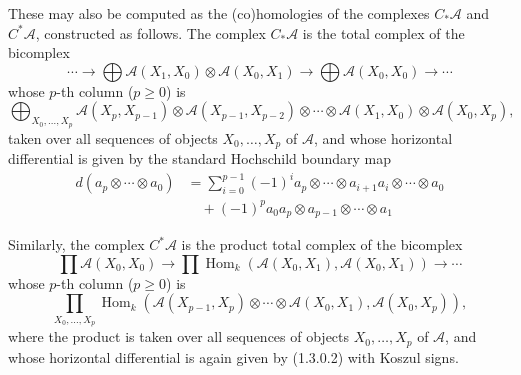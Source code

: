\documentclass[12pt]{article}
\begin{document}
These may also be computed as the (co)homologies of the complexes
\(C_{\ast}\mathcal{A}\) and \(C^{\ast}\mathcal{A}\),
constructed as follows.  
The complex \(C_{\ast}\mathcal{A}\) is the total complex of the bicomplex
\[
\cdots 
\longrightarrow 
\bigoplus \mathcal{A}(X_1,X_0) \otimes \mathcal{A}(X_0,X_1)
\longrightarrow 
\bigoplus \mathcal{A}(X_0,X_0)
\longrightarrow \cdots
\]
whose \(p\)-th column (\(p\ge0\)) is
\[
  \bigoplus_{X_0,\dots,X_p} 
  \mathcal{A}(X_p,X_{p-1}) \otimes \mathcal{A}(X_{p-1},X_{p-2})
  \otimes \cdots \otimes \mathcal{A}(X_1,X_0) \otimes \mathcal{A}(X_0,X_p),
\]
taken over all sequences of objects \(X_0,\dots,X_p\) of \(\mathcal{A}\),
and whose horizontal differential is given by the standard Hochschild boundary map
\begin{align*}
  d(a_p \otimes \cdots \otimes a_0)
  &= \sum_{i=0}^{p-1} (-1)^i a_p \otimes \cdots \otimes a_{i+1}a_i \otimes \cdots \otimes a_0 \\
  &\quad + (-1)^p a_0 a_p \otimes a_{p-1} \otimes \cdots \otimes a_1
\end{align*}

Similarly, the complex \(C^{\ast}\mathcal{A}\) is the product total complex of the bicomplex
\[
\prod \mathcal{A}(X_0,X_0)
\longrightarrow
\prod \operatorname{Hom}_k(
  \mathcal{A}(X_0,X_1),
  \mathcal{A}(X_0,X_1))
\longrightarrow
\cdots
\]
whose \(p\)-th column (\(p\ge0\)) is
\[
  \prod_{X_0,\dots,X_p}
  \operatorname{Hom}_k(
    \mathcal{A}(X_{p-1},X_p)\otimes \cdots \otimes \mathcal{A}(X_0,X_1),
    \mathcal{A}(X_0,X_p)),
\]
where the product is taken over all sequences of objects \(X_0,\dots,X_p\) of \(\mathcal{A}\),
and whose horizontal differential is again given by (1.3.0.2) with Koszul signs.
\end{document}

